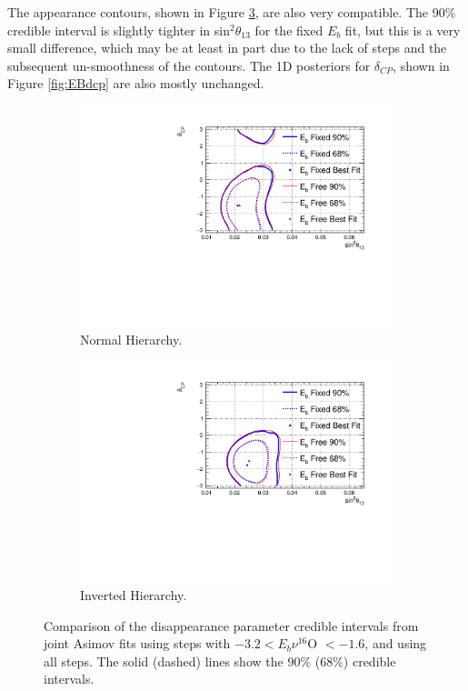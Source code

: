 The appearance contours, shown in Figure \ref{fig:EBApp}, are also very compatible. The 90$\%$ credible interval is slightly tighter in sin$^{2}\theta_{13}$ for the fixed $E_{b}$ fit, but this is a very small difference, which may be at least in part due to the lack of steps and the subsequent un-smoothness of the contours. The 1D posteriors for $\delta_{CP}$, shown in Figure \ref{fig:EBdcp} are also mostly unchanged. 

\begin{figure}
\centering
\begin{subfigure}{.7\textwidth}
  \centering
  \includegraphics[width=0.95\linewidth]{figs/comparedmach3contours_Eb_m1.6_3.2/comparedmach3contours_RCeff_app_asimovA_NH}
  \caption{Normal Hierarchy.}
  \label{fig:EBAppNH}
\end{subfigure}
\begin{subfigure}{.7\textwidth}
  \centering
  \includegraphics[width=0.95\linewidth]{figs/comparedmach3contours_Eb_m1.6_3.2/comparedmach3contours_RCeff_app_asimovA_IH}
  \caption{Inverted Hierarchy.}
  \label{fig:EBAppIH}
\end{subfigure}
\caption{Comparison of the disappearance parameter credible intervals from joint Asimov fits using steps with $ -3.2 < E_b \nu ^{16}$O $< -1.6$, and using all steps. The solid (dashed) lines show the 90$\%$ ($68\%$) credible intervals.}
\label{fig:EBApp}
\end{figure}

